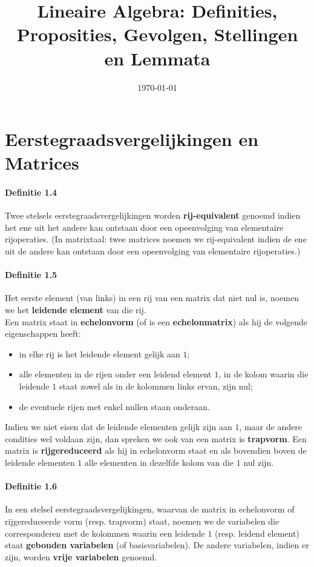 \documentclass[11pt,oneside,a4paper]{article}
\title{Lineaire Algebra: Definities, Proposities, Gevolgen, Stellingen en Lemmata}
\date{\today}
\begin{document}
	\maketitle
	
	\section{Eerstegraadsvergelijkingen en Matrices}
	
	\paragraph{Definitie 1.4}
		Twee stelsels eerstegraadsvergelijkingen worden \textbf{rij-equivalent} genoemd indien het ene uit het andere kan ontstaan door een opeenvolging van elementaire rijoperaties. (In matrixtaal: twee matrices noemen we rij-equivalent indien de ene uit de andere kan ontstaan door een opeenvolging van elementaire rijoperaties.)
	\paragraph{Definitie 1.5}
		Het eerste element (van links) in een rij van een matrix dat niet nul is, noemen we het \textbf{leidende element} van die rij. \\ Een matrix staat in \textbf{echelonvorm} (of is een \textbf{echelonmatrix}) als hij de volgende eigenschappen heeft:
		\begin{itemize}
			\item in elke rij is het leidende element gelijk aan $1$;
			\item alle elementen in de rijen onder een leidend element $1$, in de kolom waarin die leidende $1$ staat zowel als in de kolommen links ervan, zijn nul;
			\item de eventuele rijen met enkel nullen staan onderaan.
		\end{itemize}
		Indien we niet eisen dat de leidende elementen gelijk zijn aan $1$, maar de andere condities wel voldaan zijn, dan spreken we ook van een matrix is \textbf{trapvorm}. Een matrix is \textbf{rijgereduceerd} als hij in echelonvorm staat en als bovendien boven de leidende elementen $1$ alle elementen in dezelfde kolom van die $1$ nul zijn.
	\paragraph{Definitie 1.6}
		In een stelsel eerstegraadsvergelijkingen, waarvan de matrix in echelonvorm of rijgereduceerde vorm (resp. trapvorm) staat, noemen we de variabelen die corresponderen met de kolommen waarin een leidende $1$ (resp. leidend element) staat \textbf{gebonden variabelen} (of basisvariabelen). De andere variabelen, indien er zijn, worden \textbf{vrije variabelen} genoemd.
\end{document}
